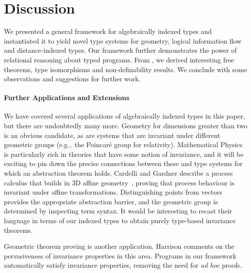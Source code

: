 \section{Discussion}
\label{sec:discussion}

We presented a general framework for algebraically indexed types and
instantiated it to yield novel type systems for geometry, logical
information flow and distance-indexed types. Our framework further
demonstrates the power of relational reasoning about typed
programs. From , we derived interesting free
theorems, type isomorphisms and non-definability results. We conclude
with some observations and suggestions for further work.

\paragraph{Further Applications and Extensions} We have covered
several applications of algebraically indexed types in this paper, but
there are undoubtedly many more. Geometry for dimensions greater than
two is an obvious candidate, as are systems that are invariant
under different geometric groups (e.g.,~the Poincar\'{e} group for
relativity). Mathematical Physics is particularly rich in theories
that have some notion of invariance, and it will be exciting to pin
down the precise connections between these and type systems for which
an abstraction theorem holds. 
Cardelli and Gardner describe a process calculus that builds in 3D affine geometry~\cite{Cardelli},
proving that process behaviour is invariant under affine transformations. Distinguishing points from vectors
provides the appropriate abstraction barrier, and the geometric group is determined by inspecting
term syntax. It would be interesting to recast their language in terms of our indexed types to
obtain purely type-based invariance theorems.

Geometric theorem
proving is another %
application. Harrison
\cite{harrison09without} comments on the pervasiveness of %
invariance properties in this area. Programs in our framework
automatically satisfy invariance properties, removing the need for
{\em ad hoc} proofs. %


